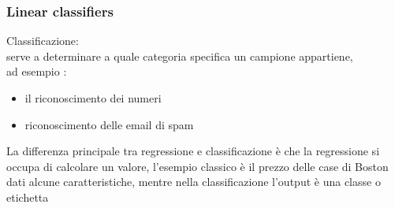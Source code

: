 \documentclass[10pt,oneside,a4paper]{article}
\begin{document}
\subsubsection{Linear classifiers}
Classificazione: \\
serve a determinare a quale categoria specifica un campione appartiene, \\
ad esempio : 
\begin{itemize}
\item il riconoscimento dei numeri
\item riconoscimento delle email di spam

\end{itemize}

La differenza principale tra regressione e classificazione è che la regressione si occupa di calcolare un valore, l'esempio classico è il prezzo delle case di Boston dati alcune caratteristiche, mentre nella classificazione l'output è una classe o etichetta
\end{document}
